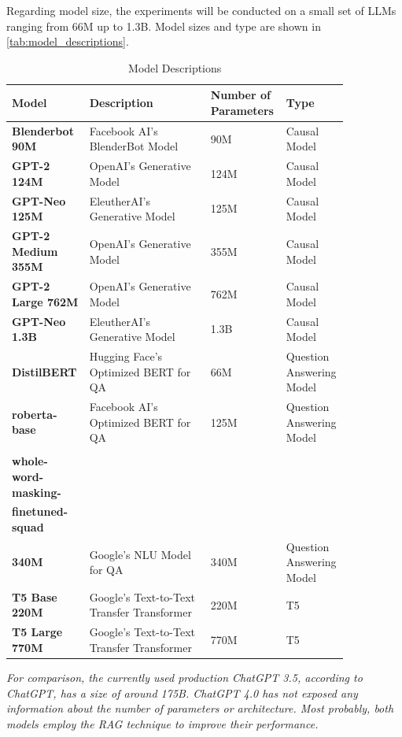 \documentclass{wseas}
\begin{document}
Regarding model size, the experiments will be conducted on a small set of LLMs
ranging from 66M up to 1.3B. Model sizes and type are shown in \autoref{tab:model_descriptions}.
\begin{table}[htbp]
  \centering
  \caption{Model Descriptions} %
  \label{tab:model_descriptions}  %
  \begin{tabular}{|p{0.2\linewidth}|p{0.35\linewidth}|p{0.15\linewidth}|p{0.15\linewidth}|}
  \hline
  \textbf{Model} & \textbf{Description} & \textbf{Number of Parameters} & \textbf{Type} \\
  \hline
  \textbf{Blenderbot 90M} & Facebook AI's BlenderBot Model & 90M & Causal Model \\
  \hline
  \textbf{GPT-2 124M} & OpenAI's Generative Model & 124M & Causal Model \\
  \hline
  \textbf{GPT-Neo 125M} & EleutherAI's Generative Model & 125M & Causal Model \\
  \hline
  \textbf{GPT-2 Medium 355M} & OpenAI's Generative Model & 355M & Causal Model \\
  \hline
  \textbf{GPT-2 Large 762M} & OpenAI's Generative Model & 762M & Causal Model \\
  \hline
  \textbf{GPT-Neo 1.3B} & EleutherAI's Generative Model & 1.3B & Causal Model \\
  \hline
  \textbf{DistilBERT} & Hugging Face's Optimized BERT for QA & 66M & Question Answering Model \\
  \hline
  \textbf{roberta-base} & Facebook AI's Optimized BERT for QA & 125M & Question Answering Model \\
  \hline
  \makecell[l]{\textbf{bert-large-uncased-}\\\textbf{whole-word-masking-}\\\textbf{finetuned-squad} \\ \textbf{340M}}
     & Google's NLU Model for QA & 340M & Question Answering Model \\
  \hline
  \textbf{T5 Base 220M} & Google's Text-to-Text Transfer Transformer & 220M & T5 \\
  \hline
  \textbf{T5 Large 770M} & Google's Text-to-Text Transfer Transformer & 770M & T5 \\
  \hline
  \end{tabular}
\end{table}  

\emph{For comparison, the currently used production ChatGPT 3.5,
according to ChatGPT, has a size of around 175B. ChatGPT 4.0 has not
exposed any information about the number of parameters or architecture.
Most probably, both models employ the RAG technique to improve their
performance.}
\end{document}

